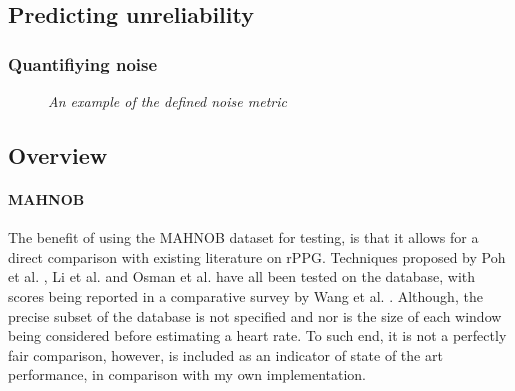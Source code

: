 \subsection{Predicting unreliability}

\subsubsection{Quantifiying noise}
\begin{figure}[H]
    \centering
    \subfloat[]{\scalebox{0.5}{}}%
    \subfloat[]{\scalebox{0.5}{ }}%
    \quad
    \subfloat[]{\scalebox{0.5}{ }}%
   \caption{\textit{An example of the defined noise metric} }
\end{figure}

\begin{figure}[H]
    \subfloat[]{\scalebox{0.6}{}}
    \qquad
    \subfloat[]{\scalebox{0.6}{}}
\end{figure}

\subsection{Overview}



\paragraph{MAHNOB}
The benefit of using the MAHNOB dataset for testing, is that it allows for a direct comparison with existing literature on rPPG.
Techniques proposed by Poh et al. \cite{poh}, Li et al. \cite{li} and Osman et al. \cite{osman} have all been tested on the database, with 
scores being reported in a comparative survey by Wang et al. \cite{comparative}.
Although, the precise subset of the database is not specified and nor is the size of each window being considered before estimating a heart rate.
To such end, it is not a perfectly fair comparison, however, is included as an indicator of state of the art performance, in comparison with my own implementation.

